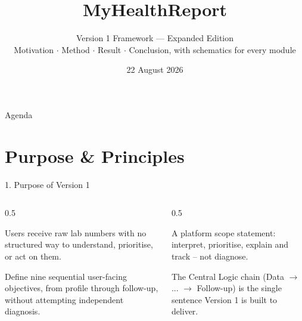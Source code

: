 \documentclass[9pt,aspectratio=169]{beamer}
\title[MyHealthReport V1]{MyHealthReport}
\subtitle{Version 1 Framework --- Expanded Edition\\ \small Motivation $\cdot$ Method $\cdot$ Result $\cdot$ Conclusion, with schematics for every module}
\author{}
\date{22 August 2026}
\begin{document}
\begin{frame}
\titlepage
\end{frame}

\begin{frame}{Agenda}
\tiny
\tableofcontents
\end{frame}

\section{Purpose \& Principles}

\begin{frame}{1. Purpose of Version 1}
\begin{columns}[T,onlytextwidth]
\begin{column}{0.5\textwidth}
\begin{tcolorbox}[colback=blue!7,colframe=blue!55!black,title=\textbf{Motivation},boxrule=0.6pt,arc=1mm,left=5pt,right=5pt,top=3pt,bottom=3pt,fonttitle=\small]
\footnotesize Users receive raw lab numbers with no structured way to understand, prioritise, or act on them.
\end{tcolorbox}
\vspace{5pt}
\begin{tcolorbox}[colback=teal!7,colframe=teal!55!black,title=\textbf{Method},boxrule=0.6pt,arc=1mm,left=5pt,right=5pt,top=3pt,bottom=3pt,fonttitle=\small]
\footnotesize Define nine sequential user-facing objectives, from profile through follow-up, without attempting independent diagnosis.
\end{tcolorbox}
\end{column}
\begin{column}{0.5\textwidth}
\begin{tcolorbox}[colback=green!8,colframe=green!45!black,title=\textbf{Result},boxrule=0.6pt,arc=1mm,left=5pt,right=5pt,top=3pt,bottom=3pt,fonttitle=\small]
\footnotesize A platform scope statement: interpret, prioritise, explain and track -- not diagnose.
\end{tcolorbox}
\vspace{5pt}
\begin{tcolorbox}[colback=orange!10,colframe=orange!65!black,title=\textbf{Conclusion},boxrule=0.6pt,arc=1mm,left=5pt,right=5pt,top=3pt,bottom=3pt,fonttitle=\small]
\footnotesize The Central Logic chain (Data $\to$ ... $\to$ Follow-up) is the single sentence Version 1 is built to deliver.
\end{tcolorbox}
\end{column}
\end{columns}
\end{frame}
\end{document}
